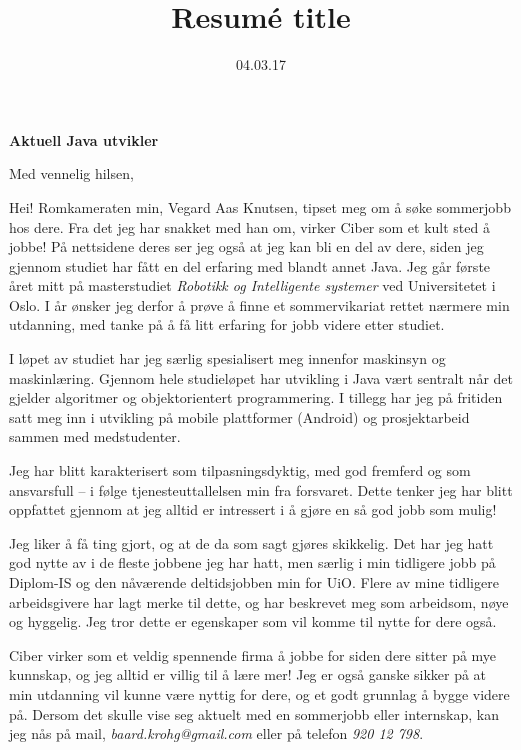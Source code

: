 \documentclass[11pt,a4paper,sans]{moderncv}        %
\title{Resumé title}                               %
\begin{document}

\date{04.03.17}
\opening{\large\textbf{Aktuell Java utvikler}}
\closing{Med vennelig hilsen,}

\makelettertitle

Hei! Romkameraten min, Vegard Aas Knutsen, tipset meg om å søke sommerjobb hos dere. Fra det jeg har snakket med han om, virker Ciber som et kult sted å jobbe! På nettsidene deres ser jeg også at jeg kan bli en del av dere, siden jeg gjennom studiet har fått en del erfaring med blandt annet Java. Jeg går første året mitt på masterstudiet \emph{Robotikk og Intelligente systemer} ved Universitetet i Oslo. I år ønsker jeg derfor å prøve å finne et sommervikariat rettet nærmere min utdanning, med tanke på å få litt erfaring for jobb videre etter studiet.

I løpet av studiet har jeg særlig spesialisert meg innenfor maskinsyn og maskinlæring. Gjennom hele studieløpet har utvikling i Java vært sentralt når det gjelder algoritmer og objektorientert programmering. I tillegg har jeg på fritiden satt meg inn i utvikling på mobile plattformer (Android) og prosjektarbeid sammen med medstudenter.

Jeg har blitt karakterisert som tilpasningsdyktig, med god fremferd og som ansvarsfull -- i følge tjenesteuttallelsen min fra forsvaret. Dette tenker jeg har blitt oppfattet gjennom at jeg alltid er intressert i å gjøre en så god jobb som mulig!

Jeg liker å få ting gjort, og at de da som sagt gjøres skikkelig. Det har jeg hatt god nytte av i de fleste jobbene jeg har hatt, men særlig i min tidligere jobb på Diplom-IS og den nåværende deltidsjobben min for UiO. Flere av mine tidligere arbeidsgivere har lagt merke til dette, og har beskrevet meg som arbeidsom, nøye og hyggelig.
Jeg tror dette er egenskaper som vil komme til nytte for dere også.

Ciber virker som et veldig spennende firma å jobbe for siden dere sitter på mye kunnskap, og jeg alltid er villig til å lære mer! Jeg er også ganske sikker på at min utdanning vil kunne være nyttig for dere, og et godt grunnlag å bygge videre på. Dersom det skulle vise seg aktuelt med en sommerjobb eller internskap, kan jeg nås på mail, \emph{baard.krohg@gmail.com} eller på telefon \emph{920 12 798}.

\makeletterclosing
\end{document}
